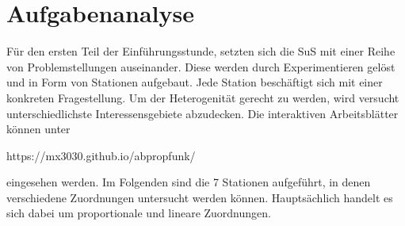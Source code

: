 \documentclass[../main.tex]{subfiles}
\begin{document}
\section{Aufgabenanalyse} \label{section:Materialien}
Für den ersten Teil der Einführungsstunde, setzten sich die SuS mit einer Reihe von Problemstellungen auseinander. Diese werden durch Experimentieren gelöst und in Form von Stationen aufgebaut. Jede Station beschäftigt sich mit einer konkreten Fragestellung. Um der Heterogenität gerecht zu werden, wird versucht unterschiedlichste Interessensgebiete abzudecken. Die interaktiven Arbeitsblätter können unter 
\begin{center}
    https://mx3030.github.io/abpropfunk/
\end{center} 
eingesehen werden. Im Folgenden sind die 7 Stationen aufgeführt, in denen verschiedene Zuordnungen untersucht werden können. Hauptsächlich handelt es sich dabei um proportionale und lineare Zuordnungen.
\end{document}
